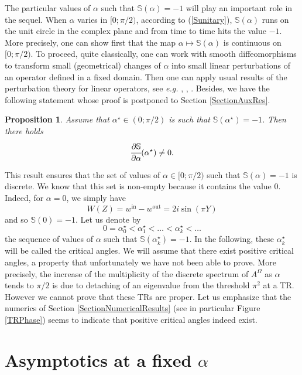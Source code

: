 \documentclass[11pt,a4paper]{article}
\newcommand{\Om}{\Omega}
\newcommand{\mrm}[1]{\mathrm{#1}}
\newtheorem{proposition}[theorem]{Proposition}
\begin{document}
\noindent The particular values of $\alpha$ such that $\mathbb{S}(\alpha)=-1$ will play an important role in the sequel. When $\alpha$ varies in $[0;\pi/2)$, according to 
(\ref{Sunitary}), $\mathbb{S}(\alpha)$ runs on the unit circle in the complex plane and from time to time hits the value $-1$. More precisely, one can show first that the map $\alpha\mapsto \mathbb{S}(\alpha)$ is continuous on $[0;\pi/2)$. To proceed, quite classically, one can work with smooth diffeomorphisms to transform small (geometrical) changes of $\alpha$ into small linear perturbations of an operator defined in a fixed domain. Then one can apply usual results of the perturbation theory for linear operators, see \textit{e.g.} \cite[Chap.\,7]{Kato95}, \cite[Chap.\,10]{BiSo87}, \cite[Chap.\,XII]{RS78}. Besides, we have the following statement whose proof is postponed to Section \ref{SectionAuxRes}.
\begin{proposition}\label{PropoDiscrete}
Assume that $\alpha^\star\in(0;\pi/2)$ is such that $\mathbb{S}(\alpha^\star)=-1$. Then there holds
\[
\cfrac{\partial\mathbb{S}}{\partial\alpha}(\alpha^\star)\ne0.
\]
\end{proposition} 
\noindent This result ensures that the set of values of $\alpha\in[0;\pi/2)$ such that $\mathbb{S}(\alpha)=-1$ is discrete. We know that this set is non-empty because it contains the value $0$. Indeed, for $\alpha=0$, we simply have 
\[
W(Z)= w^{\mrm{in}}-w^{\mrm{out}}=2i\sin(\pi Y)
\]
and so $\mathbb{S}(0)=-1$. Let us denote by 
\begin{equation}\label{DefAlphaP}
0=\alpha_0^\star<\alpha_1^\star<\dots<\alpha_k^\star<\dots
\end{equation}
the sequence of values of $\alpha$ such that $\mathbb{S}(\alpha^\star_k)=-1$. In the following, these $\alpha_k^\star$ will be called the critical angles. We will assume that there exist positive critical angles, a property that unfortunately we have not been able to prove. More precisely, the increase of the multiplicity of the discrete spectrum of $A^\Om$ as $\alpha$ tends to $\pi/2$ is due to detaching of an eigenvalue from the threshold $\pi^2$ at a TR. However we cannot prove that these TRs are proper. Let us emphasize that the numerics of Section \ref{SectionNumericalResults} (see in particular Figure \ref{TRPhase}) seems to indicate that positive critical angles indeed exist. 


\section{Asymptotics at a fixed $\alpha$}\label{SectionAsymptoAlpha}
\end{document}
